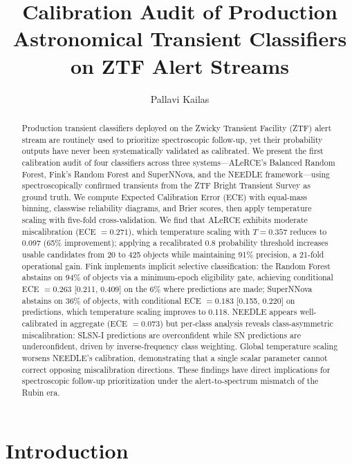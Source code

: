 \documentclass[twocolumn]{aastex631}
\begin{document}
\title{Calibration Audit of Production Astronomical Transient Classifiers on ZTF Alert Streams}

\author{Pallavi Kailas}

\begin{abstract}
Production transient classifiers deployed on the Zwicky Transient Facility (ZTF) alert stream are routinely used to prioritize spectroscopic follow-up, yet their probability outputs have never been systematically validated as calibrated. We present the first calibration audit of four classifiers across three systems---ALeRCE's Balanced Random Forest, Fink's Random Forest and SuperNNova, and the NEEDLE framework---using spectroscopically confirmed transients from the ZTF Bright Transient Survey as ground truth. We compute Expected Calibration Error (ECE) with equal-mass binning, classwise reliability diagrams, and Brier scores, then apply temperature scaling with five-fold cross-validation. We find that ALeRCE exhibits moderate miscalibration (ECE $= 0.271$), which temperature scaling with $T = 0.357$ reduces to 0.097 (65\% improvement); applying a recalibrated 0.8 probability threshold increases usable candidates from 20 to 425 objects while maintaining 91\% precision, a 21-fold operational gain. Fink implements implicit selective classification: the Random Forest abstains on 94\% of objects via a minimum-epoch eligibility gate, achieving conditional ECE $= 0.263$ [0.211, 0.409] on the 6\% where predictions are made; SuperNNova abstains on 36\% of objects, with conditional ECE $= 0.183$ [0.155, 0.220] on predictions, which temperature scaling improves to 0.118. NEEDLE appears well-calibrated in aggregate (ECE $= 0.073$) but per-class analysis reveals class-asymmetric miscalibration: SLSN-I predictions are overconfident while SN predictions are underconfident, driven by inverse-frequency class weighting. Global temperature scaling worsens NEEDLE's calibration, demonstrating that a single scalar parameter cannot correct opposing miscalibration directions. These findings have direct implications for spectroscopic follow-up prioritization under the alert-to-spectrum mismatch of the Rubin era.
\end{abstract}


\section{Introduction} \label{sec:intro}
\end{document}
